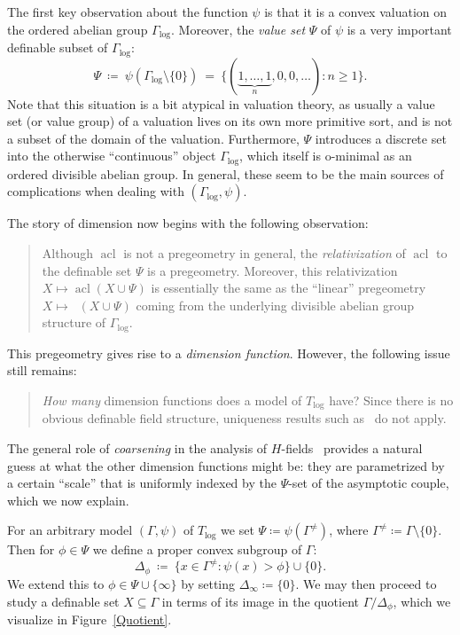 \documentclass[11pt]{amsart}
\theoremstyle{plain}
\theoremstyle{definition}
\numberwithin{equation}{section}
\newcommand\Q{\mathbb{Q}}
\DeclareMathOperator\lspan{span}
\DeclareMathOperator\Qspan{\lspan_{\Q}}
\newcommand\0{\varnothing}
\begin{document}
\medskip\noindent
The first key observation about the function $\psi$ is that it is a convex valuation on the ordered abelian group $\Gamma_{\log}$. Moreover, the \emph{value set} $\Psi$ of $\psi$ is a very important definable subset of $\Gamma_{\log}$:
\[
\Psi \ \coloneqq \ \psi(\Gamma_{\log}\setminus\{0\}) \ = \ \{(\underbrace{1,\ldots,1}_n,0,0,\ldots):n\geq 1\}.
\]
Note that this situation is a bit atypical in valuation theory, as usually a value set (or value group) of a valuation lives on its own more primitive sort, and is not a subset of the domain of the valuation. Furthermore, $\Psi$ introduces a discrete set into the otherwise ``continuous'' object $\Gamma_{\log}$, which itself is o-minimal as an ordered divisible abelian group. In general, these seem to be the main sources of complications when dealing with $(\Gamma_{\log},\psi)$.

\medskip\noindent
The story of dimension now begins with the following observation:

\begin{quote}
Although $\operatorname{acl}$ is not a pregeometry in general, the \emph{relativization} of $\operatorname{acl}$ to the definable set $\Psi$ is a pregeometry. Moreover, this relativization $X\mapsto \operatorname{acl}(X\cup\Psi)$ is essentially the same as the ``linear'' pregeometry $X\mapsto \Qspan(X\cup\Psi)$ coming from the underlying divisible abelian group structure of $\Gamma_{\log}$. 
\end{quote}

\noindent
This pregeometry gives rise to a \emph{dimension function}. However, the following issue still remains:
\begin{quote}
\emph{How many} dimension functions does a model of $T_{\log}$ have? Since there is no obvious definable field structure, uniqueness results such as~\cite[Theorem 3.48]{fornasiero-dimmatroiddense} do not apply.
\end{quote}

\noindent
The general role of \emph{coarsening} in the analysis of $H$-fields~\cite{ADAMTT} provides a natural guess at what the other dimension functions might be:
they are parametrized by a certain ``scale'' that is uniformly indexed by the $\Psi$-set of the asymptotic couple, which we now explain.

\medskip\noindent
For an arbitrary model $(\Gamma,\psi)$ of $T_{\log}$ we set $\Psi\coloneqq \psi(\Gamma^{\neq})$, where $\Gamma^{\neq}\coloneqq \Gamma\setminus\{0\}$.
Then for $\phi\in\Psi$ we define a proper convex subgroup of $\Gamma$:
\[
\Delta_{\phi} \ \coloneqq \ \{x\in\Gamma^{\neq}:\psi(x)>\phi\}\cup\{0\}.
\]
We extend this to $\phi\in\Psi\cup\{\infty\}$ by setting $\Delta_{\infty}\coloneqq\{0\}$. We may then proceed to study a definable set $X\subseteq\Gamma$ in terms of its image in the quotient $\Gamma/\Delta_{\phi}$, which we visualize in Figure~\ref{Quotient}.
\end{document}
